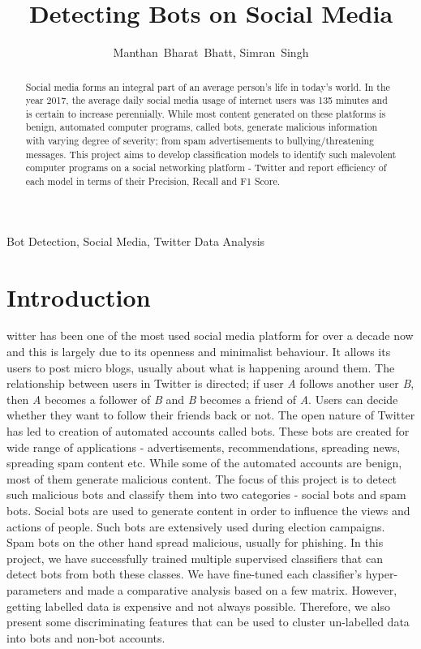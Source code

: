 \documentclass[journal]{IEEEtran}
\begin{document}
\title{Detecting Bots on Social Media}

\author{Manthan~Bharat~Bhatt, Simran~Singh}

\maketitle

\begin{abstract}
Social media forms an integral part of an average person’s life in today’s world. In the year 2017, the average daily social media usage of internet users was 135 minutes and is certain to increase perennially. While most content generated on these platforms is benign, automated computer programs, called bots, generate malicious information with varying degree of severity; from spam advertisements to bullying/threatening messages. This project aims to develop classification models to identify such malevolent computer programs on a social networking platform - Twitter and report efficiency of each model in terms of their Precision, Recall and F1 Score.
\end{abstract}

\begin{IEEEkeywords}
Bot Detection, Social Media, Twitter Data Analysis
\end{IEEEkeywords}

\section{Introduction}
witter has been one of the most used social media platform for over a decade now and this is largely due to its openness and minimalist behaviour. It allows its users to post micro blogs, usually about what is happening around them. The relationship between users in Twitter is directed; if user \textit{A} follows another user \textit{B}, then \textit{A} becomes a follower of \textit{B} and \textit{B} becomes a friend of \textit{A}. Users can decide whether they want to follow their friends back or not. The open nature of Twitter has led to creation of automated accounts called bots. These bots are created for wide range of applications - advertisements, recommendations, spreading news, spreading spam content etc. While some of the automated accounts are benign, most of them generate malicious content. The focus of this project is to detect such malicious bots and classify them into two categories - social bots and spam bots. Social bots are used to generate content in order to influence the views and actions of people. Such bots are extensively used during election campaigns. Spam bots on the other hand spread malicious, usually for phishing. In this project, we have successfully trained multiple supervised classifiers that can detect bots from both these classes. We have fine-tuned each classifier's hyper-parameters and made a comparative analysis based on a few matrix. However, getting labelled data is expensive and not always possible. Therefore, we also present some discriminating features that can be used to cluster un-labelled data into bots and non-bot accounts. 
\end{document}
